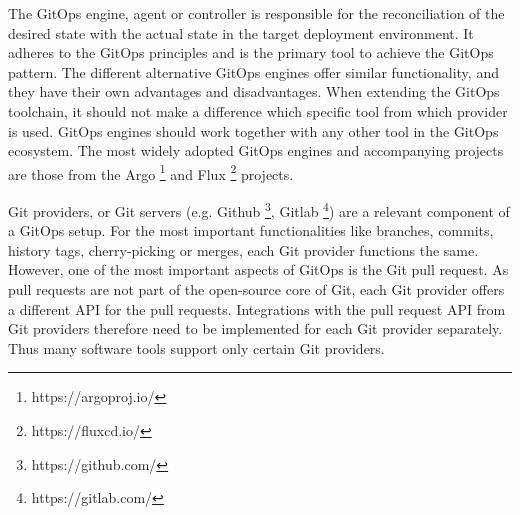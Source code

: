 

The GitOps engine, agent or controller is responsible for the
reconciliation of the desired state with the actual state
in the target deployment environment.
It adheres to the GitOps principles and is the primary tool
to achieve the GitOps pattern.
The different alternative GitOps engines offer similar functionality,
and they have their own advantages and disadvantages.
When extending the GitOps toolchain, it should not make a difference which specific
tool from which provider is used.
GitOps engines should work together with any other tool in the GitOps ecosystem.
The most widely adopted GitOps engines and accompanying projects are those from
the Argo
\footnote{https://argoproj.io/}
and Flux
\footnote{https://fluxcd.io/}
projects.









Git providers, or Git servers (e.g. Github \footnote{https://github.com/}, Gitlab \footnote{https://gitlab.com/}) are a relevant component of
a GitOps setup.
For the most important functionalities like branches, commits, history
tags, cherry-picking or merges, each Git provider functions the same.
However, one of the most important aspects of GitOps is the Git pull request.
As pull requests are not part of the open-source core of Git,
each Git provider offers a different API for the pull requests.
Integrations with the pull request API from Git providers therefore need to be implemented
for each Git provider separately. Thus many software tools support only certain Git providers.





























